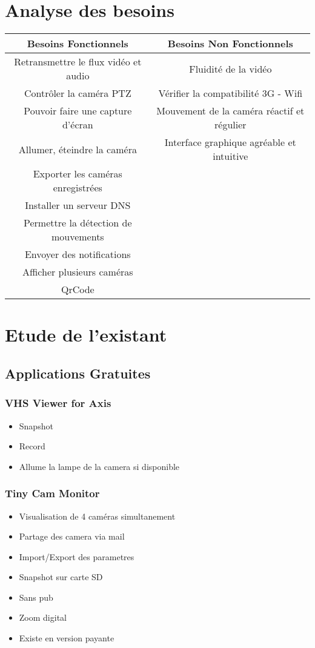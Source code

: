 \documentclass[a4paper,10pt]{report}
\begin{document}
\author{Jerome NAHELOU, Quentin NEBOUT, Romain SOLVE, Fabien QUINTARD}

\chapter{Analyse des besoins}
\begin{center}
\begin{tabular}{|c|c}
\hline
Besoins Fonctionnels & Besoins Non Fonctionnels\\
\hline
Retransmettre le flux vidéo et audio & Fluidité de la vidéo\\
Contrôler la caméra PTZ & Vérifier la compatibilité 3G - Wifi\\
Pouvoir faire une capture d'écran & Mouvement de la caméra réactif et
régulier\\
Allumer, éteindre la caméra & Interface graphique agréable et intuitive\\
Exporter les caméras enregistrées &\\
Installer un serveur DNS &\\
Permettre la détection de mouvements &\\
Envoyer des notifications &\\
Afficher plusieurs caméras &\\
QrCode &\\
\hline
\end{tabular}
\end{center}

\chapter{Etude de l'existant}
\section{Applications Gratuites}
\subsection{VHS Viewer for Axis}
\begin{itemize}
  \item Snapshot
  \item Record
  \item Allume la lampe de la camera si disponible
\end{itemize}

\subsection{Tiny Cam Monitor}
\begin{itemize}
  \item Visualisation de 4 caméras simultanement
  \item Partage des camera via mail
  \item Import/Export des parametres
  \item Snapshot sur carte SD
  \item Sans pub
  \item Zoom digital
  \item Existe en version payante
\end{itemize}
\end{document}
